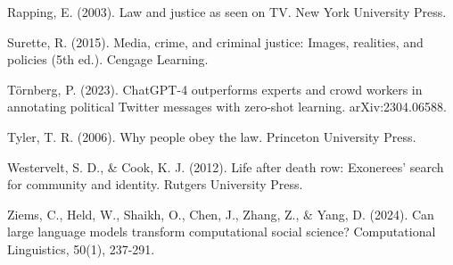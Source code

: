 \documentclass[
]{article}
\begin{document}
Rapping, E. (2003). Law and justice as seen on TV. New York University
Press.

Surette, R. (2015). Media, crime, and criminal justice: Images,
realities, and policies (5th ed.). Cengage Learning.

Törnberg, P. (2023). ChatGPT-4 outperforms experts and crowd workers in
annotating political Twitter messages with zero-shot learning.
arXiv:2304.06588.

Tyler, T. R. (2006). Why people obey the law. Princeton University
Press.

Westervelt, S. D., \& Cook, K. J. (2012). Life after death row:
Exonerees' search for community and identity. Rutgers University Press.

Ziems, C., Held, W., Shaikh, O., Chen, J., Zhang, Z., \& Yang, D.
(2024). Can large language models transform computational social
science? Computational Linguistics, 50(1), 237-291.
\end{document}
